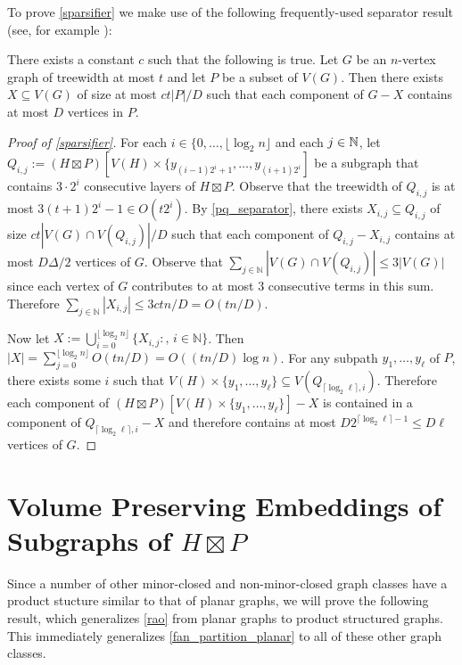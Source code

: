 \documentclass{patmorin}
\begin{document}
To prove \cref{sparsifier} we make use of the following frequently-used separator result (see, for example \cite[Lemma~11]{bose.dujmovic.ea:asymptotically}):


\begin{lem}\label{pq_separator}
  There exists a constant $c$ such that the following is true.
  Let $G$ be an $n$-vertex graph of treewidth at most $t$ and let $P$ be a subset of $V(G)$.  Then there exists $X\subseteq V(G)$ of size at most $ct|P|/D$ such that each component of $G-X$ contains at most $D$ vertices in $P$.
\end{lem}

\begin{proof}[Proof of \cref{sparsifier}]
  For each $i\in\{0,\ldots,\lfloor\log_2 n\rfloor$ and each $j\in\mathbb{N}$, let $Q_{i,j}:=(H\boxtimes P)[V(H)\times\{y_{(i-1)2^i+1},\ldots,y_{(i+1)2^i}]$ be a subgraph that contains $3\cdot 2^i$ consecutive layers of $H\boxtimes P$.  Observe that the treewidth of $Q_{i,j}$ is at most $3(t+1)2^i-1\in O(t2^i)$.  By \cref{pq_separator}, there exists $X_{i,j}\subseteq Q_{i,j}$ of size $ct|V(G)\cap V(Q_{i,j})|/D$ such that each component of $Q_{i,j}-X_{i,j}$ contains at most $D\Delta/2$ vertices of $G$.  Observe that $\sum_{j\in\mathbb{N}}|V(G)\cap V(Q_{i,j})| \le 3|V(G)|$ since each vertex of $G$ contributes to at most $3$ consecutive terms in this sum.  Therefore $\sum_{j\in\mathbb{N}}|X_{i,j}|\le 3ctn/D=O(tn/D)$.

  Now let $X:=\bigcup_{i=0}^{\lfloor\log_2 n\rfloor}\{X_{i,j}:,\, i\in\mathbb{N}\}$.  Then $|X|=\sum_{j=0}^{\lfloor\log_2 n\rfloor}O(tn/D)=O((tn/D)\log n)$. For any subpath $y_1,\ldots,y_{\ell}$ of $P$, there exists some $i$ such that $V(H)\times\{y_1,\ldots,y_\ell\}\subseteq V(Q_{\lceil\log_2\ell\rceil,i})$. Therefore each component of $(H\boxtimes P)[V(H)\times\{y_1,\ldots,y_\ell\}]-X$ is contained in a component of $Q_{\lceil\log_2\ell\rceil,i}-X$ and therefore contains at most $D 2^{\lceil\log_2\ell\rceil-1}\le D\ell$ vertices of $G$.
\end{proof}


\section{\boldmath Volume Preserving Embeddings of Subgraphs of $H\boxtimes P$}

Since a number of other minor-closed and non-minor-closed graph classes have a product stucture similar to that of planar graphs, we will prove the following result, which generalizes \cref{rao} from planar graphs to product structured graphs. This immediately generalizes \cref{fan_partition_planar} to all of these other graph classes.
\end{document}
